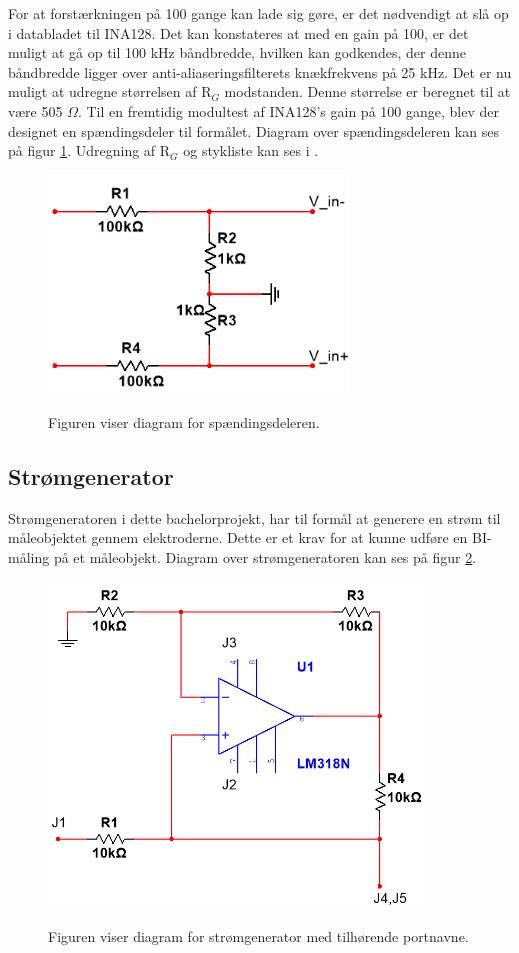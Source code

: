 For at forstærkningen på 100 gange kan lade sig gøre, er det nødvendigt at slå op i databladet til INA128. Det kan konstateres at med en gain på 100, er det muligt at gå op til 100 kHz båndbredde, hvilken kan godkendes, der denne båndbredde ligger over anti-aliaseringsfilterets knækfrekvens på 25 kHz. Det er nu muligt at udregne størrelsen af R$_{G}$ modstanden. Denne størrelse er beregnet til at være 505 $\Omega$. Til en fremtidig modultest af INA128's gain på 100 gange, blev der designet en spændingsdeler til formålet. Diagram over spændingsdeleren kan ses på figur \ref{fig:spaedingdeler}. Udregning af R$_{G}$ og stykliste kan ses i .

\begin{figure}[H]
\centering
{\includegraphics[width=8cm]
{Figure/spaedingdeler}}
\caption{Figuren viser diagram for spændingsdeleren.}
\label{fig:spaedingdeler}
\end{figure}

 
 
\subsection{Strømgenerator}
Strømgeneratoren i dette bachelorprojekt, har til formål at generere en strøm til måleobjektet gennem elektroderne. Dette er et krav for at kunne udføre en BI-måling på et måleobjekt\cite{Brantlov2017}. Diagram over strømgeneratoren kan ses på figur \ref{fig:StromgeneratorLM318}.

\begin{figure}[H]
\centering
{\includegraphics[width=10cm]
{Figure/StromgeneratorLM318}}
\caption{Figuren viser diagram for strømgenerator med tilhørende portnavne.}
\label{fig:StromgeneratorLM318}
\end{figure}

